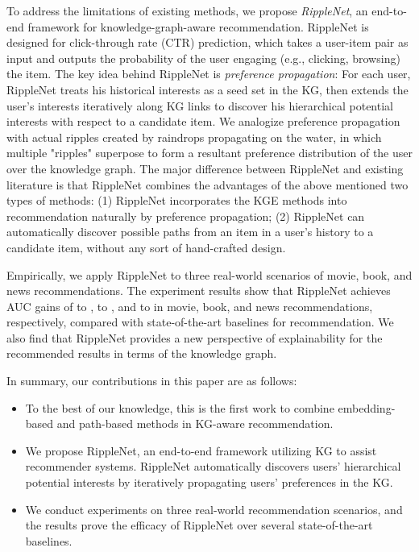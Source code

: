 \documentclass[sigconf]{acmart}
\begin{document}
	To address the limitations of existing methods, we propose \textit{RippleNet}, an end-to-end framework for knowledge-graph-aware recommendation.
	RippleNet is designed for click-through rate (CTR) prediction, which takes a user-item pair as input and outputs the probability of the user engaging (e.g., clicking, browsing) the item.
	The key idea behind RippleNet is \textit{preference propagation}:
	For each user, RippleNet treats his historical interests as a seed set in the KG, then extends the user's interests iteratively along KG links to discover his hierarchical potential interests with respect to a candidate item.
	We analogize preference propagation with actual ripples created by raindrops propagating on the water, in which multiple "ripples" superpose to form a resultant preference distribution of the user over the knowledge graph.
	The major difference between RippleNet and existing literature is that RippleNet combines the advantages of the above mentioned two types of methods:
	(1) RippleNet incorporates the KGE methods into recommendation naturally by preference propagation;
	(2) RippleNet can automatically discover possible paths from an item in a user's history to a candidate item, without any sort of hand-crafted design.
	
	Empirically, we apply RippleNet to three real-world scenarios of movie, book, and news recommendations.
	The experiment results show that RippleNet achieves AUC gains of  to ,  to , and  to  in movie, book, and news recommendations, respectively, compared with state-of-the-art baselines for recommendation.
	We also find that RippleNet provides a new perspective of explainability for the recommended results in terms of the knowledge graph.
	
	In summary, our contributions in this paper are as follows:
	\begin{itemize}
		\item
			To the best of our knowledge, this is the first work to combine embedding-based and path-based methods in KG-aware recommendation.
		\item
			We propose RippleNet, an end-to-end framework utilizing KG to assist recommender systems.
			RippleNet automatically discovers users' hierarchical potential interests by iteratively propagating users' preferences in the KG.
		\item
			We conduct experiments on three real-world recommendation scenarios, and the results prove the efficacy of RippleNet over several state-of-the-art baselines.
	\end{itemize}
	
\end{document}
